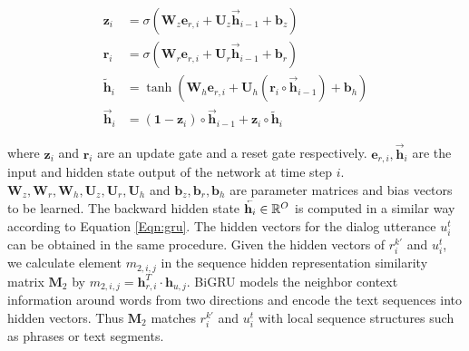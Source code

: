  \begin{footnotesize}
\begin{equation}\label{Eqn:gru}
\begin{aligned}
\mathbf{z}_i&=\sigma(\mathbf{W}_z\mathbf{e}_{r,i}+\mathbf{U}_z\vec{\mathbf{h}}_{i-1}+\mathbf{b}_z)\\
\mathbf{r}_i&=\sigma(\mathbf{W}_r\mathbf{e}_{r,i}+\mathbf{U}_r \vec{\mathbf{h}}_{i-1}+\mathbf{b}_r)\\
\tilde{\mathbf{h}}_i&=\tanh(\mathbf{W}_h\mathbf{e}_{r,i}+\mathbf{U}_h(\mathbf{r}_i\circ\vec{\mathbf{h}}_{i-1})+\mathbf{b}_h)\\
\vec{\mathbf{h}}_i&=(\mathbf{1}-\mathbf{z}_i)\circ\vec{\mathbf{h}}_{i-1}+\mathbf{z}_i\circ\tilde{\mathbf{h}}_i
\end{aligned}
\end{equation}
\end{footnotesize}
where $\mathbf{z}_i$ and $\mathbf{r}_i$ are an update gate and a reset gate respectively. $\textbf{e}_{r,i}, \vec{\textbf{h}}_i$ are the input and hidden state output of the network at time step $i$. $\mathbf{W}_z,\mathbf{W}_r,\mathbf{W}_h,\mathbf{U}_z,\mathbf{U}_r,\mathbf{U}_h$ and $\mathbf{b}_z,\mathbf{b}_r,\mathbf{b}_h $ are parameter matrices and bias vectors to be learned. The backward hidden state $ \overset{{}_{\shortleftarrow}}{\mathbf{h}_i} \in \mathbb{R}^O$ is computed in a similar way according to Equation \ref{Eqn:gru}. The hidden vectors for the dialog utterance $u_i^t$ can be obtained in the same procedure. Given the hidden vectors of $r_i^{k'}$ and $u_i^t$, we calculate element $m_{2,i,j}$ in the sequence hidden representation similarity matrix $\mathbf{M}_2$ by $m_{2,i,j} = \mathbf{h}_{r,i}^T \cdot \mathbf{h}_{u,j}$.
BiGRU models the neighbor context information around words from two directions and encode the text sequences into hidden vectors. Thus $\mathbf{M}_2$ matches $r_i^{k'}$ and $u_i^t$ with local sequence structures such as phrases or text segments. %
 
